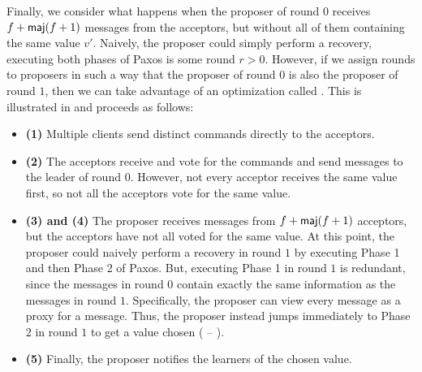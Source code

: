 %
%

Finally, we consider what happens when the proposer of round $0$ receives $f +
\textsf{maj}(f+1)$  messages from the acceptors, but without all of
them containing the same value $v'$. Naively, the proposer could simply
perform a recovery, executing both phases of Paxos is some round $r > 0$.
However, if we assign rounds to proposers in such a way that the proposer of
round $0$ is also the proposer of round $1$, then we can take advantage of an
optimization called . This is illustrated in
 and proceeds as follows:

\begin{itemize}
  \item \textbf{(1)}
    Multiple clients send distinct commands directly to the acceptors.

  \item \textbf{(2)}
    The acceptors receive and vote for the commands and send 
    messages to the leader of round $0$. However, not every acceptor receives
    the same value first, so not all the acceptors vote for the same value.

  \item \textbf{(3) and (4)}
    The proposer receives  messages from $f+\textsf{maj}(f+1)$
    acceptors, but the acceptors have not all voted for the same value. At this
    point, the proposer could naively perform a recovery in round $1$ by
    executing Phase 1 and then Phase 2 of Paxos. But, executing Phase 1 in
    round $1$ is redundant, since the  messages in round $0$
    contain exactly the same information as the  messages in
    round $1$. Specifically, the proposer can view every 
    message as a proxy for a  message. Thus, the proposer
    instead jumps immediately to Phase 2 in round $1$ to get a value chosen
    ( -- ).

  \item \textbf{(5)}
    Finally, the proposer notifies the learners of the chosen value.
\end{itemize}
